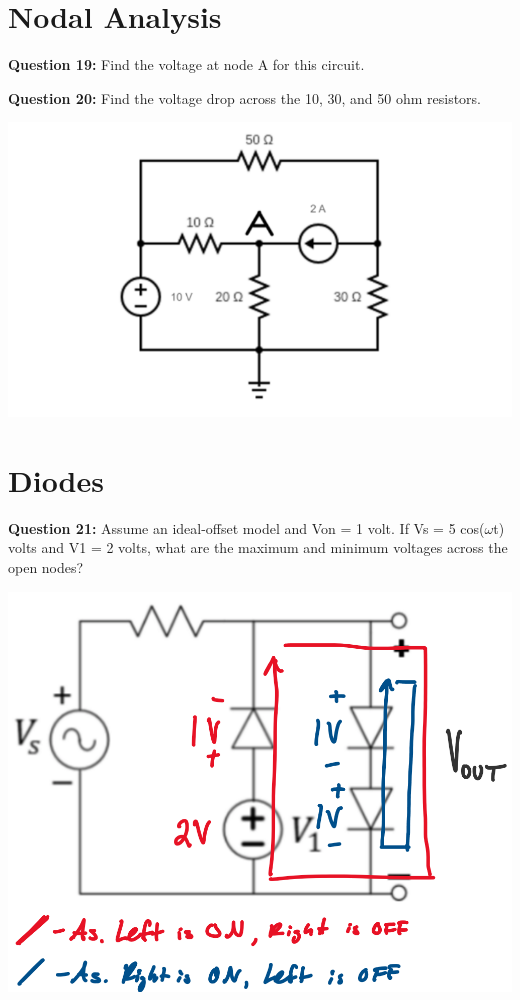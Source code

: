 \documentclass{article}
\begin{document}
\section*{Nodal Analysis}
\textbf{Question 19:} Find the voltage at node A for this circuit.

\textbf{Question 20:} Find the voltage drop across the 10, 30, and 50 ohm resistors.

\begin{center}
    \includegraphics[width=0.75\linewidth]{figures/34.png}
\end{center}

\pagebreak

\section*{Diodes}
\textbf{Question 21:} Assume an ideal-offset model and Von = 1 volt. If Vs = 5 cos(\(\omega\)t) volts and V1 = 2 volts, what are the maximum and minimum voltages across the open nodes?

\begin{center}

        \includegraphics[width=0.75\linewidth]{figures/21_sol.png}
\end{center}
\end{document}
